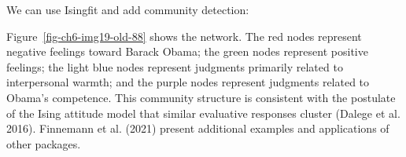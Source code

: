 \documentclass[
  a4paper,
  DIV=11,
  numbers=noendperiod,
  oneside]{scrreprt}
\newenvironment{Shaded}{}{}
\newcommand{\AttributeTok}[1]{\textcolor[rgb]{0.84,0.23,0.29}{#1}}
\newcommand{\CommentTok}[1]{\textcolor[rgb]{0.42,0.45,0.49}{#1}}
\newcommand{\ConstantTok}[1]{\textcolor[rgb]{0.00,0.36,0.77}{#1}}
\newcommand{\DecValTok}[1]{\textcolor[rgb]{0.00,0.36,0.77}{#1}}
\newcommand{\FunctionTok}[1]{\textcolor[rgb]{0.44,0.26,0.76}{#1}}
\newcommand{\NormalTok}[1]{\textcolor[rgb]{0.14,0.16,0.18}{#1}}
\newcommand{\OtherTok}[1]{\textcolor[rgb]{0.44,0.26,0.76}{#1}}
\newcommand{\SpecialCharTok}[1]{\textcolor[rgb]{0.00,0.36,0.77}{#1}}
\newcommand{\StringTok}[1]{\textcolor[rgb]{0.01,0.18,0.38}{#1}}
\begin{document}
We can use Isingfit and add community detection:

\begin{Shaded}
\end{Shaded}

Figure~\ref{fig-ch6-img19-old-88} shows the network. The red nodes
represent negative feelings toward Barack Obama; the green nodes
represent positive feelings; the light blue nodes represent judgments
primarily related to interpersonal warmth; and the purple nodes
represent judgments related to Obama's competence. This community
structure is consistent with the postulate of the Ising attitude model
that similar evaluative responses cluster (Dalege et al. 2016).
Finnemann et al. (2021) present additional examples and applications of
other packages.
\end{document}
